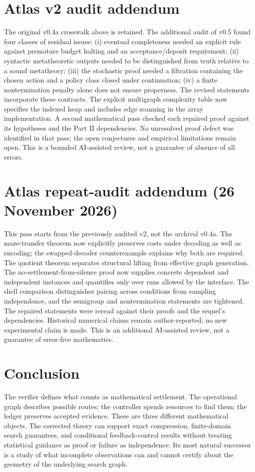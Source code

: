 \documentclass[11pt]{article}
\theoremstyle{definition}\newtheorem{definition}[theorem]{Definition}\newtheorem{example}[theorem]{Example}\newtheorem{conjecture}[theorem]{Conjecture}
\begin{document}
\section*{Atlas v2 audit addendum}
The original v0.4a crosswalk above is retained. The additional audit of v0.5 found four classes of residual issues: (i) eventual completeness needed an explicit rule against premature budget halting and an acceptance/deposit requirement; (ii) syntactic metatheoretic outputs needed to be distinguished from truth relative to a sound metatheory; (iii) the stochastic proof needed a filtration containing the chosen action and a policy class closed under continuation; (iv) a finite nontermination penalty alone does not ensure properness. The revised statements incorporate these contracts. The explicit multigraph complexity table now specifies the indexed heap and includes edge scanning in the array implementation. A second mathematical pass checked each repaired proof against its hypotheses and the Part II dependencies. No unresolved proof defect was identified in that pass; the open conjectures and empirical limitations remain open. This is a bounded AI-assisted review, not a guarantee of absence of all errors.
\section*{Atlas repeat-audit addendum (26 November 2026)}
This pass starts from the previously audited v2, not the archival v0.4a. The maze-transfer theorem now explicitly preserves costs under decoding as well as encoding; the swapped-decoder counterexample explains why both are required. The quotient theorem separates structural lifting from effective graph generation. The no-settlement-from-silence proof now supplies concrete dependent and independent instances and quantifies only over runs allowed by the interface. The shell comparison distinguishes pairing across conditions from sampling independence, and the semigroup and nontermination statements are tightened. The repaired statements were reread against their proofs and the sequel's dependencies. Historical numerical claims remain author-reported; no new experimental claim is made. This is an additional AI-assisted review, not a guarantee of error-free mathematics.
\section{Conclusion}
The verifier defines what counts as mathematical settlement. The operational graph describes possible routes; the controller spends resources to find them; the ledger preserves accepted evidence. These are three different mathematical objects. The corrected theory can support exact compression, finite-domain search guarantees, and conditional feedback-control results without treating statistical guidance as proof or failure as independence. Its most natural successor is a study of what incomplete observations can and cannot certify about the geometry of the underlying search graph.
\end{document}
